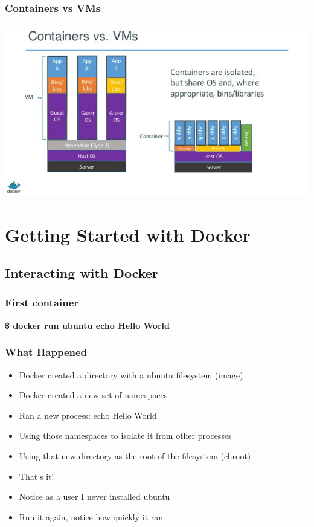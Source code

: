 \documentclass[aspectratio=169,11pt,hyperref={colorlinks=true}]{beamer}
\begin{document}
\begin{frame}
    \frametitle{Containers vs VMs}
    \centering
    \includegraphics[width=.9\textwidth]{containers-vs-vm.jpg}

\end{frame}

\section{Getting Started with Docker}
\subsection{Interacting with Docker}
\begin{frame}
    \frametitle{First container}
    \textbf{\$ docker run ubuntu echo Hello World} \\
\end{frame}

\begin{frame}
    \frametitle{What Happened}
    \begin{itemize}
        \item Docker created a directory with a ubuntu filesystem (image)
        \item Docker created a new set of namespaces
        \item Ran a new process: echo Hello World
        \item Using those namespaces to isolate it from other processes
        \item Using that new directory as the root of the filesystem (chroot)
        \item That's it!
        \item Notice as a user I never installed ubuntu
        \item Run it again, notice how quickly it ran
    \end{itemize}
\end{frame}
\end{document}
